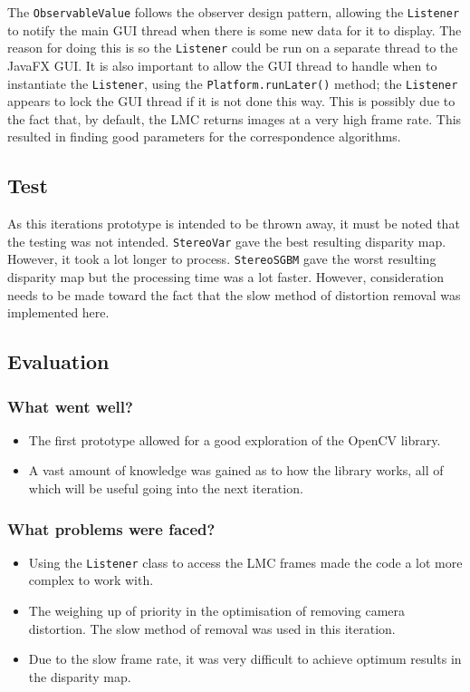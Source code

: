 \documentclass[11pt,oneside]{report}
\newcommand\code[1]{\texttt{#1}}
\begin{document}
		The \code{ObservableValue} follows the observer design pattern, allowing the \code{Listener} to notify the main GUI thread when there is some new data for it to display.
		The reason for doing this is so the \code{Listener} could be run on a separate thread to the JavaFX GUI.
		It is also important to allow the GUI thread to handle when to instantiate the \code{Listener}, using the \code{Platform.runLater()} method; the \code{Listener} appears to lock the GUI thread if it is not done this way.
		This is possibly due to the fact that, by default, the LMC returns images at a very high frame rate.
		This resulted in finding good parameters for the correspondence algorithms.
		\subsection{Test}
		As this iterations prototype is intended to be thrown away, it must be noted that the testing was not intended.
		\code{StereoVar} gave the best resulting disparity map.
		However, it took a lot longer to process.
		\code{StereoSGBM} gave the worst resulting disparity map but the processing time was a lot faster.
		However, consideration needs to be made toward the fact that the slow method of distortion removal was implemented here.
		\subsection{Evaluation}
		\subsubsection{What went well?}
		\begin{itemize}
			\item The first prototype allowed for a good exploration of the OpenCV library.
			\item A vast amount of knowledge was gained as to how the library works, all of which will be useful going into the next iteration.
		\end{itemize}
		
		
		\subsubsection{What problems were faced?}
		\begin{itemize}
			\item Using the \code{Listener} class to access the LMC frames made the code a lot more complex to work with.
			\item The weighing up of priority in the optimisation of removing camera distortion. The slow method of removal was used in this iteration.
			\item Due to the slow frame rate, it was very difficult to achieve optimum results in the disparity map.
		\end{itemize}				
\end{document}
